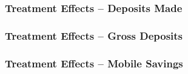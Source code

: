 \documentclass{beamer}
\begin{document}
\begin{frame} \frametitle{Treatment Effects -- Deposits Made}
	

\end{frame}

\begin{frame} \frametitle{Treatment Effects -- Gross Deposits}
	

\end{frame}

\begin{frame} \frametitle{Treatment Effects -- Mobile Savings}
	
	\begin{landscape}  \end{landscape}

\end{frame}
\end{document}
